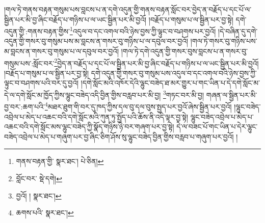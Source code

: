 །གལ་ཏེ་གནས་བརྟན་གསུམ་པས་བླངས་པ་ན་དགེ་འདུན་གྱི་གནས་བརྟན་སློང་བར་བྱེད་ན་བརྗོད་པ་དང་པོ་ལ་སྦྱིན་པར་མི་བྱ་ཞིང་བརྗོད་པ་གཉིས་པ་ལ་ཡང་སྦྱིན་པར་མི་བྱའོ། །བརྗོད་པ་གསུམ་པ་ལ་སྦྱིན་པར་བྱ་སྟེ། དགེ་འདུན་གྱི་:གནས་བརྟན་གྱིས་\footnote{གནས་བརྟན་གྱི་  སྣར་ཐང་།  པེ་ཅིན། }འདུལ་བ་དང་འགལ་བའི་ཉེས་བྱས་ཀྱི་ལྟུང་བ་བཤགས་པར་བྱའོ། །དེ་བཞིན་དུ་དགེ་འདུན་གྱི་གསར་བུ་གསུམ་པས་མ་བླངས་ན་གསར་བུ་གཉིས་པ་ལ་དབུལ་བར་བྱའོ། །གལ་ཏེ་གསར་བུ་གཉིས་པས་མ་བླངས་ན་གསར་བུ་གསུམ་པ་ལ་དབུལ་བར་བྱའོ། །གལ་ཏེ་དགེ་འདུན་གྱི་གསར་བུས་བླངས་པ་ན་གསར་བུ་གསུམ་པས་:སློང་བར་\footnote{བློང་བར་  སྡེ་དགེ། }བྱེད་ན་བརྗོད་པ་དང་པོ་ལ་སྦྱིན་པར་མི་བྱ་ཞིང་བརྗོད་པ་གཉིས་པ་ལ་ཡང་སྦྱིན་པར་མི་བྱའོ། །བརྗོད་པ་གསུམ་པ་ལ་སྦྱིན་པར་བྱ་སྟེ། དགེ་འདུན་གྱི་གསར་བུ་གསུམ་པས་འདུལ་བ་དང་འགལ་བའི་ཉེས་བྱས་ཀྱི་ལྟུང་བ་བཤགས་པའི་བར་དུ་བྱའོ། །དགེ་སློང་མའི་འཁོར་དེའི་ལྷུང་བཟེད་ཐ་མར་གྱུར་པ་གང་ཡིན་པ་དེ་དགེ་སློང་མ་དེ་ལ་དགེ་སློང་མ་ཁྱོད་ཀྱིས་ལྷུང་བཟེད་འདི་བྱིན་གྱིས་བརླབ་པར་མི་བྱ། \footnote{བྱའོ། །   སྣར་ཐང་། }གཏང་བར་མི་བྱ། གཞན་ལ་སྦྱིན་པར་མི་བྱ་བར་:ཆག་པའི་\footnote{ཆགས་པའི་  སྣར་ཐང་། }མཐར་ཐུག་གི་བར་དུ་ཁད་ཀྱིས་དལ་བུ་དལ་བུས་སྤྱད་པར་བྱའོ་ཞེས་སྦྱིན་པར་བྱའོ། །ལྷུང་བཟེད་འབྲེལ་པ་མེད་པ་འཆང་བའི་དགེ་སློང་མའི་ཀུན་ཏུ་སྤྱོད་པའི་ཆོས་ནི་འདི་ལྟར་བྱ་སྟེ། ལྷུང་བཟེད་འབྲེལ་པ་མེད་པ་འཆང་བའི་དགེ་སློང་མས་ལྷུང་བཟེད་ཀྱི་སྣོད་གཉིས་ཉེ་བར་གཞག་པར་བྱ་སྟེ། དེ་ལ་བཟང་པོ་གང་ཡིན་པ་དེར་ལྷུང་བཟེད་འབྲེལ་པ་མེད་པ་གཞུག་པར་བྱ་ཞིང་ཅིག་ཤོས་སུ་ལྷུང་བཟེད་བྱིན་གྱིས་བརླབ་པ་གཞུག་པར་བྱའོ། །
